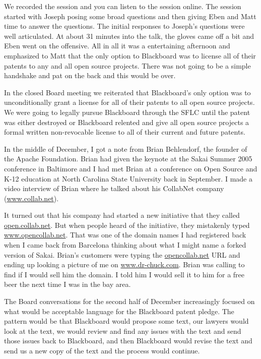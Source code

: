\documentclass[12pt]{book}
\begin{document}
We recorded the session and you can listen to the session
online.  The session started with Joseph posing some broad
questions and then giving Eben and Matt time to answer
the questions.  The initial responses to Joseph's questions
were well articulated.  At about 31 minutes into the talk,
the gloves came off a bit and Eben went on the offensive.
All in all it was a entertaining afternoon and emphasized
to Matt that the only option to Blackboard was to license
all of their patents to any and all open source projects.
There was not going to be a simple handshake and pat on
the back and this would be over.

In the closed Board meeting we reiterated that Blackboard's
only option was to unconditionally grant a license for all
of their patents to all open source projects.  We were going
to legally pursue Blackboard through the SFLC until the
patent was either destroyed or Blackboard relented and
give all open source projects a formal written non-revocable
license to all of their current and future patents.



In the middle of December, I got a note from Brian Behlendorf,
the founder of the Apache Foundation.  Brian had given the
keynote at the Sakai Summer 2005 conference in Baltimore
and I had met Brian at a conference on Open Source and K-12
education at North Carolina State University back in September.
I made a video interview of Brian where he talked about
his CollabNet company (\url{www.collab.net}).

It turned out that his company had started a new initiative
that they called \url{open.collab.net}.  But when people
heard of the initiative, they mistakenly typed
\url{www.opencollab.net}.  That was one of the domain names
I had registered back when I came back from Barcelona
thinking about what I might name a forked version of
Sakai.
Brian's customers were typing the \url{opencollab.net} URL
and ending up looking a picture of me on
\url{www.dr-chuck.com}.  Brian was calling to find if I would
sell him the domain.   I told him I would sell it to him
for a free beer the next time I was in the bay area.




The Board conversations for the second half of December increasingly
focused on what would be acceptable language for the
Blackboard patent pledge. The pattern would be that Blackboard
would propose some text, our lawyers would look at the text,
we would review and find any issues with the text and
send those issues back to Blackboard, and then Blackboard
would revise the text and send us a new copy of the text
and the process would continue.
\end{document}
